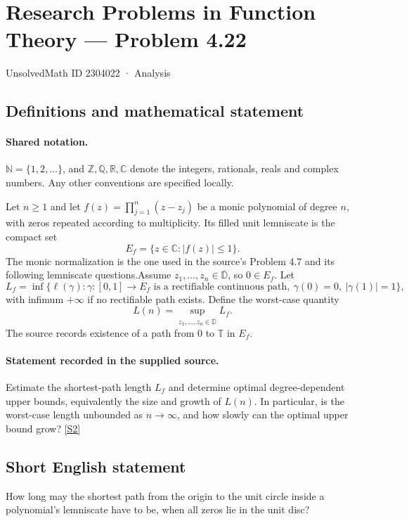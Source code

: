 \documentclass[11pt]{book}
\newcommand{\sref}[2]{\hyperlink{source:#1:#2}{[S#2]}}
\begin{document}
\setcounter{section}{2304021}
\section{Research Problems in Function Theory — Problem 4.22}\label{2304022}
{\small\sffamily UnsolvedMath ID 2304022 · Analysis}
\subsection{Definitions and mathematical statement}

\paragraph{Shared notation.}$\mathbb N=\{1,2,\ldots\}$, and $\mathbb Z,\mathbb Q,\mathbb R,\mathbb C$ denote the integers, rationals, reals and complex numbers. Any other conventions are specified locally.


Let $n\ge1$ and let $f(z)=\prod_{j=1}^n(z-z_j)$ be a monic polynomial of degree $n$, with zeros repeated according to multiplicity. Its filled unit lemniscate is the compact set
\[E_f=\{z\in\mathbb C:|f(z)|\le1\}.
\]
The monic normalization is the one used in the source's Problem 4.7 and its following lemniscate questions.Assume $z_1,\ldots,z_n\in\overline{\mathbb D}$, so $0\in E_f$. Let
\[L_f=\inf\{\ell(\gamma):\gamma:[0,1]\to E_f\text{ is a rectifiable continuous path},\ \gamma(0)=0,\ |\gamma(1)|=1\},\]
with infimum $+\infty$ if no rectifiable path exists. Define the worst-case quantity
\[L(n)=\sup_{z_1,\ldots,z_n\in\overline{\mathbb D}}L_f.
\]
The source records existence of a path from $0$ to $\mathbb T$ in $E_f$.
\paragraph{Statement recorded in the supplied source.}
Estimate the shortest-path length $L_f$ and determine optimal degree-dependent upper bounds, equivalently the size and growth of $L(n)$. In particular, is the worst-case length unbounded as $n\to\infty$, and how slowly can the optimal upper bound grow? \sref{2304022}{2}
\subsection{Short English statement}
How long may the shortest path from the origin to the unit circle inside a polynomial’s lemniscate have to be, when all zeros lie in the unit disc?
\end{document}
